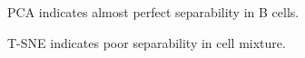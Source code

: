 \documentclass[3p,authoryear,preprint,12pt]{elsarticle}
\makeatletter
\def\fixFloatSize#1{}%
\makeatother
\begin{document}
\egroup
\bgroup
\fixFloatSize{img/BPCA.png}
\begin{figure}[!htbp]
	\centering \makeatletter{}
	\makeatother 
	\caption{{PCA indicates almost perfect separability in B cells.}}
	\label{f-c2b15a1baca9}
\end{figure}
\egroup
\bgroup
\fixFloatSize{img/mixtSNE.png}
\begin{figure}[!htbp]
	\centering \makeatletter{}
	\makeatother 
	\caption{{T-SNE indicates poor separability in cell mixture.}}
	\label{f-c2b15a1baca9}
\end{figure}
\end{document}
